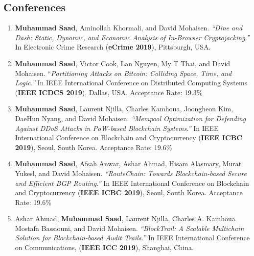 \documentclass[10pt]{article}
\begin{document}
\subsection*{\sc \textcolor{red!70!black}{ Conferences}}\label{publications}
\begin{enumerate}\itemsep=1.5mm

\item {\bf Muhammad Saad}, Aminollah Khormali, and David Mohaisen. {\em ``Dine and Dash: Static, Dynamic, and Economic Analysis of In-Browser Cryptojacking.''} In Electronic Crime Research ({\bf eCrime 2019}), Pittsburgh, USA. 


\item {\bf Muhammad Saad}, Victor Cook, Lan Nguyen, My T Thai, and David Mohaisen. ``{\em Partitioning Attacks on Bitcoin: Colliding Space, Time, and Logic.''} In IEEE International Conference on Distributed Computing Systems ({\bf IEEE ICDCS 2019}), Dallas, USA. {\textcolor{red!70!black}{Acceptance Rate: 19.3\%}}

\item {\bf Muhammad Saad}, Laurent Njilla, Charles Kamhoua,  Joongheon Kim,  DaeHun Nyang, and David Mohaisen. {\em ``Mempool Optimization for Defending Against DDoS Attacks in PoW-based Blockchain Systems.''} In IEEE International Conference on Blockchain and Cryptocurrency ({\bf IEEE ICBC 2019}), Seoul, South Korea. {\textcolor{red!70!black}{Acceptance Rate: 19.6\%}}

\item {\bf Muhammad Saad}, Afsah Anwar, Ashar Ahmad,  Hisam Alasmary,  Murat Yukesl, and David Mohaisen. {\em ``RouteChain: Towards Blockchain-based Secure and Efficient BGP Routing.''} In IEEE International Conference on Blockchain and Cryptocurrency ({\bf IEEE ICBC 2019}),  Seoul, South Korea. {\textcolor{red!70!black}{Acceptance Rate: 19.6\%}}


\item Ashar Ahmad, {\bf Muhammad Saad}, Laurent Njilla, Charles A. Kamhoua Mostafa Bassiouni, and David Mohaisen. {\em ``BlockTrail: A Scalable Multichain Solution for Blockchain-based Audit Trails.''} In IEEE International Conference on Communications, ({\bf IEEE ICC 2019}), Shanghai, China.

\end{enumerate}
\end{document}
